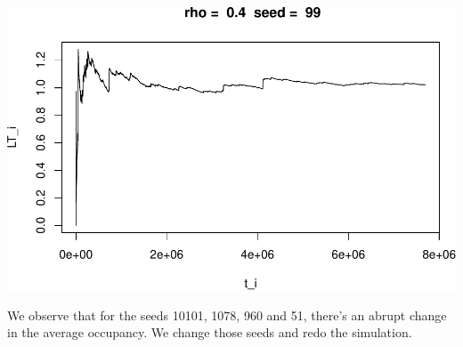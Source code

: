 \documentclass[]{article}
\begin{document}
\includegraphics{003_files/figure-latex/unnamed-chunk-13-10.pdf}

We observe that for the seeds 10101, 1078, 960 and 51, there's an abrupt
change in the average occupancy. We change those seeds and redo the
simulation.
\end{document}
